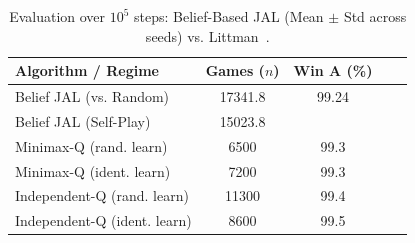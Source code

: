 \begin{table}[htbp]
    \centering
    \scriptsize
    \caption{Evaluation over $10^5$ steps: Belief-Based JAL (Mean $\pm$ Std across seeds) vs. Littman~\cite{littman1994markov}.}
    \label{tab:marl_results}
    \begin{tabular}{lcccc}
        \toprule
        \textbf{Algorithm / Regime}  & \textbf{Games ($n$)} & \textbf{Win A (\%)} \\
        \midrule
        Belief JAL (vs. Random)      & 17341.8              & 99.24               \\
        Belief JAL (Self-Play)       & 15023.8              &                     \\
        \midrule
        Minimax-Q (rand. learn)      & 6500                 & 99.3                \\
        Minimax-Q (ident. learn)     & 7200                 & 99.3                \\
        Independent-Q (rand. learn)  & 11300                & 99.4                \\
        Independent-Q (ident. learn) & 8600                 & 99.5                \\
        \bottomrule
    \end{tabular}
\end{table}
